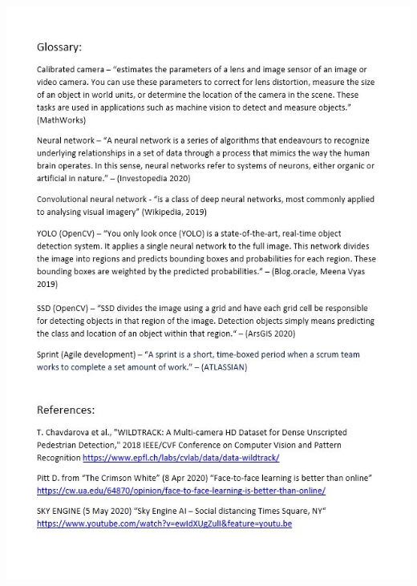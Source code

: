\documentclass[12pt]{report}
\begin{document}
\includegraphics[width=160mm]{./images/appendix/PDD5.JPG}
\end{document}
